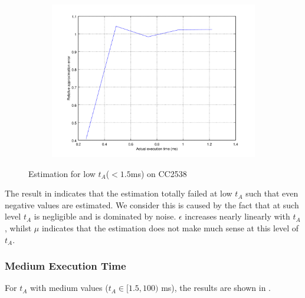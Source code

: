 \begin{figure}[ht!]
\begin{subfigure}{0.45\linewidth}
	\end{subfigure}
	\begin{subfigure}{0.45\linewidth}
	\center
	\includegraphics[width=\linewidth]{fig/lowrtvtaerr.png}
	\end{subfigure}
	\caption{Estimation for low $t_A$($<1.5$ms) on CC2538}
	\label{Fig: Estimation for low tA}
\end{figure}

The result in  indicates that the estimation totally failed at low $t_A$ such that even negative values are estimated. We consider this is caused by the fact that at such level $t_A$ is negligible and is dominated by noise. $\epsilon$ increases nearly linearly with $t_A$, whilst $\mu$ indicates that the estimation does not make much sense at this level of $t_A$.

\subsubsection{Medium Execution Time}

For $t_A$ with medium values ($t_A \in[1.5, 100)$ ms), the results are shown in .

